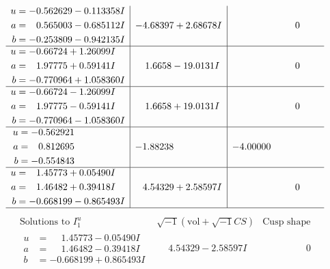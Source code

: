\documentclass[1p]{elsarticle_modified}
\theoremstyle{definition}
\newcommand{\I}{\sqrt{-1}}
\begin{document}
$$\begin{array}{c|c|c}
\begin{aligned}
u &= -0.562629 - 0.113358 I \\
a &= \phantom{-}0.565003 - 0.685112 I \\
b &= -0.253809 - 0.942135 I\end{aligned}
 & -4.68397 + 2.68678 I & \phantom{-0.000000 } 0 \\ \hline\begin{aligned}
u &= -0.66724 + 1.26099 I \\
a &= \phantom{-}1.97775 + 0.59141 I \\
b &= -0.770964 + 1.058360 I\end{aligned}
 & \phantom{-}1.6658 - 19.0131 I & \phantom{-0.000000 } 0 \\ \hline\begin{aligned}
u &= -0.66724 - 1.26099 I \\
a &= \phantom{-}1.97775 - 0.59141 I \\
b &= -0.770964 - 1.058360 I\end{aligned}
 & \phantom{-}1.6658 + 19.0131 I & \phantom{-0.000000 } 0 \\ \hline\begin{aligned}
u &= -0.562921\phantom{ +0.000000I} \\
a &= \phantom{-}0.812695\phantom{ +0.000000I} \\
b &= -0.554843\phantom{ +0.000000I}\end{aligned}
 & -1.88238\phantom{ +0.000000I} & -4.00000\phantom{ +0.000000I} \\ \hline\begin{aligned}
u &= \phantom{-}1.45773 + 0.05490 I \\
a &= \phantom{-}1.46482 + 0.39418 I \\
b &= -0.668199 - 0.865493 I\end{aligned}
 & \phantom{-}4.54329 + 2.58597 I & \phantom{-0.000000 } 0\\
 \hline 
 \end{array}$$\newpage$$\begin{array}{c|c|c}  
\text{Solutions to }I^u_{1}& \I (\text{vol} + \sqrt{-1}CS) & \text{Cusp shape}\\
 \hline 
\begin{aligned}
u &= \phantom{-}1.45773 - 0.05490 I \\
a &= \phantom{-}1.46482 - 0.39418 I \\
b &= -0.668199 + 0.865493 I\end{aligned}
 & \phantom{-}4.54329 - 2.58597 I & \phantom{-0.000000 } 0 \\ \hline\begin{aligned}

\end{aligned}
\end{array}$$
\end{document}
